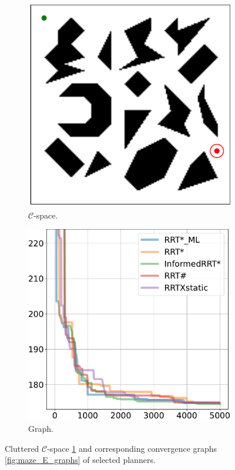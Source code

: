 \documentclass{ctuthesis}
\begin{document}
\begin{figure}[!ht]
  \centering 
  \begin{subfigure}[b]{0.48\textwidth}
      \includegraphics[width=\textwidth]{figChap5/Maze_clutter.pdf}
      \caption{$\mathcal{C}$-space.}
      \label{fig:maze_clutter_Cspace} 
  \end{subfigure}  
  \begin{subfigure}[b]{0.5\textwidth}
      \includegraphics[width=\textwidth]{figChap5/graph_clutter_20pt.pdf}  
      \caption{Graph.}
      \label{fig:maze_clutter_graphs}
  \end{subfigure}
  \caption{Cluttered $\mathcal{C}$-space \ref{fig:maze_clutter_Cspace} and 
  corresponding convergence graphs \ref{fig:maze_E_graphs} of selected planners.}
  \label{fig:maze_clutter}
\end{figure}
\end{document}
